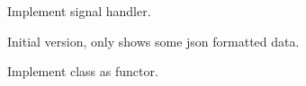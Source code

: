 
\begin{DoxyRefList}
\item[\label{todo__todo000002}%
\hypertarget{todo__todo000002}{}%
Member \hyperlink{fccf_m_q_t_t_8r383_2main_8cpp_a0e480b941baf86ce6a2d491e5ace4670}{handle\+S\+I\+G\+I\+NT} (int signal)]Implement signal handler.  
\item[\label{todo__todo000003}%
\hypertarget{todo__todo000003}{}%
Class \hyperlink{class_json_m_q_t_t}{Json\+M\+Q\+TT} ]Initial version, only shows some json formatted data.  
\item[\label{todo__todo000001}%
\hypertarget{todo__todo000001}{}%
Class \hyperlink{class_on_off_controller}{On\+Off\+Controller} ]Implement class as functor. 
\end{DoxyRefList}